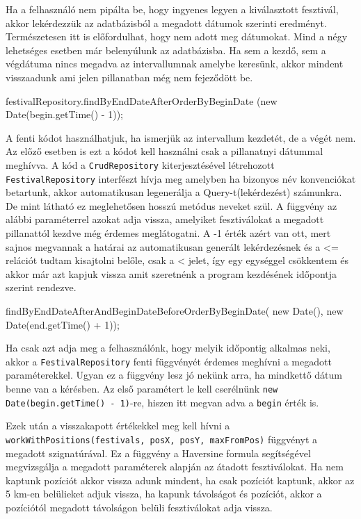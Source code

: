 Ha a felhasználó nem pipálta be, hogy ingyenes legyen a kiválasztott fesztivál, akkor lekérdezzük az adatbázisból a megadott dátumok szerinti eredményt.
Természetesen itt is előfordulhat, hogy nem adott meg dátumokat. Mind a négy lehetséges esetben már belenyúlunk az adatbázisba. Ha sem a kezdő, sem a végdátuma nincs megadva az intervallumnak amelybe keresünk, akkor mindent visszaadunk ami jelen pillanatban még nem fejeződött be.

\begin{java}
festivalRepository.findByEndDateAfterOrderByBeginDate
(new Date(begin.getTime() - 1));
\end{java}

A fenti kódot használhatjuk, ha ismerjük az intervallum kezdetét, de a végét nem. Az előző esetben is ezt a kódot kell használni csak a pillanatnyi dátummal meghívva.
A kód a \texttt{CrudRepository} kiterjesztésével létrehozott \texttt{FestivalRepository} interfészt hívja meg amelyben ha bizonyos név konvenciókat betartunk, akkor automatikusan legenerálja a Query-t(lekérdezést) számunkra. De mint látható ez meglehetősen hosszú metódus neveket szül. A függvény az alábbi paraméterrel azokat adja vissza, amelyiket fesztiválokat a megadott pillanattól kezdve még érdemes meglátogatni. A -1 érték azért van ott, mert sajnos megvannak a határai az automatikusan generált lekérdezésnek és a <= relációt tudtam kisajtolni belőle, csak a < jelet, így egy egységgel csökkentem és akkor már azt kapjuk vissza amit szeretnénk a program kezdésének időpontja szerint rendezve.

\begin{java}
findByEndDateAfterAndBeginDateBeforeOrderByBeginDate(
new Date(), new Date(end.getTime() + 1));
\end{java}

Ha csak azt adja meg a felhasználónk, hogy melyik időpontig alkalmas neki, akkor a \texttt{FestivalRepository} fenti függvényét érdemes meghívni a megadott paraméterekkel.
Ugyan ez a függvény lesz jó nekünk arra, ha mindkettő dátum benne van a kérésben. Az első paramétert le kell cserélnünk \texttt{new Date(begin.getTime() - 1)}-re, hiszen itt megvan adva a \texttt{begin} érték is.

Ezek után a visszakapott értékekkel meg kell hívni a \texttt{workWithPositions(festivals, posX, posY, maxFromPos)} függvényt a megadott szignatúrával. Ez a függvény a Haversine formula segítségével megvizsgálja a megadott paraméterek alapján az átadott fesztiválokat. Ha nem kaptunk pozíciót akkor vissza adunk mindent, ha csak pozíciót kaptunk, akkor az 5 km-en belülieket adjuk vissza, ha kapunk távolságot és pozíciót, akkor a pozíciótól megadott távolságon belüli fesztiválokat adja vissza.

